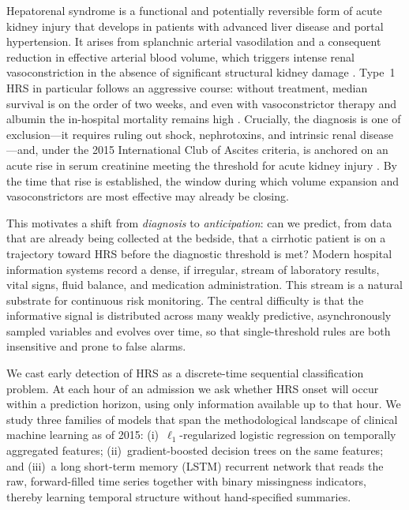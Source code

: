 \documentclass{article}
\begin{document}
Hepatorenal syndrome is a functional and potentially reversible form of acute
kidney injury that develops in patients with advanced liver disease and portal
hypertension. It arises from splanchnic arterial vasodilation and a consequent
reduction in effective arterial blood volume, which triggers intense renal
vasoconstriction in the absence of significant structural kidney damage
\citep{Gines2009,Salerno2007}. Type~1 HRS in particular follows an aggressive
course: without treatment, median survival is on the order of two weeks, and even
with vasoconstrictor therapy and albumin the in-hospital mortality remains high
\citep{Wong2011}. Crucially, the diagnosis is one of exclusion---it requires
ruling out shock, nephrotoxins, and intrinsic renal disease---and, under the 2015
International Club of Ascites criteria, is anchored on an acute rise in serum
creatinine meeting the threshold for acute kidney injury \citep{Angeli2015}. By the
time that rise is established, the window during which volume expansion and
vasoconstrictors are most effective may already be closing.

This motivates a shift from \emph{diagnosis} to \emph{anticipation}: can we predict,
from data that are already being collected at the bedside, that a cirrhotic
patient is on a trajectory toward HRS before the diagnostic threshold is met?
Modern hospital information systems record a dense, if irregular, stream of
laboratory results, vital signs, fluid balance, and medication administration.
This stream is a natural substrate for continuous risk monitoring. The central
difficulty is that the informative signal is distributed across many weakly
predictive, asynchronously sampled variables and evolves over time, so that
single-threshold rules are both insensitive and prone to false alarms.

We cast early detection of HRS as a discrete-time sequential classification
problem. At each hour of an admission we ask whether HRS onset will occur within a
prediction horizon, using only information available up to that hour. We study
three families of models that span the methodological landscape of clinical
machine learning as of 2015: (i)~$\ell_1$-regularized logistic regression on
temporally aggregated features; (ii)~gradient-boosted decision trees on the same
features; and (iii)~a long short-term memory (LSTM) recurrent network
\citep{Hochreiter1997} that reads the raw, forward-filled time series together
with binary missingness indicators, thereby learning temporal structure without
hand-specified summaries.
\end{document}
